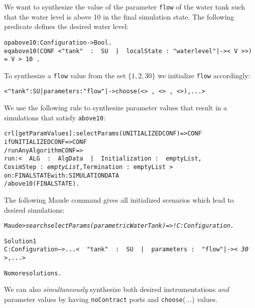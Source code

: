 \begin{example}\label{ex:dse}
We want to synthesize the value of  the parameter \texttt{flow} of
the water tank  such that the water level is above 10 in the final
simulation state. The following  predicate defines the desired water level:

\small
\begin{alltt}
op above10 : Configuration -> Bool .
eq above10(CONF\,< "tank"\,\,:\,\,SU\,\,|\,\,localState\,:\,"waterlevel" |-> <\,V\,> >)\,=\,V\,>\,10\,.  
\end{alltt}
\normalsize

\noindent  To synthesize a  \texttt{flow} value from the set
$\{1, 2,30\}$ we initialize \texttt{flow} accordingly:

\small
\begin{alltt}
< "tank" : SU | parameters : "flow" |-> choose(<\;>\,,\,<\;>\,,\,<\;>), ... >
\end{alltt}
\normalsize

We use the following rule to synthesize parameter values that result
in a simulations that satisfy \texttt{above10}:

\small
\begin{alltt}
crl [getParamValues] : selectParams(UNITIALIZEDCONF) => CONF 
  if UNITIALIZEDCONF => CONF
  / runAnyAlgorithm CONF => 
       run: <\,\,ALG\,\,:\,\,AlgData\,\,|\,\,Initialization\,:\,\,emptyList, 
                            CosimStep\,:\,\emph{emptyList}, Termination\,:\,emptyList\,> 
       on: FINALSTATE with: SIMULATIONDATA
  / above10(FINALSTATE) .
\end{alltt}
\normalsize

\noindent  The following Maude command gives all initialized scenarios
which lead to desired simulations:  

\small
\begin{alltt}
Maude> \emph{search selectParams(parametricWaterTank) =>! C:Configuration .}

Solution 1
C:Configuration --> ... <\,\,"tank"\,\,:\,\,SU\,\,|\,\,parameters\,:\,\,"flow" |-> \emph{<\,30\,>}, ... >

No more solutions.
\end{alltt}
\normalsize
\end{example}

We
can also \emph{simultaneously} synthesize both desired
instrumentations \emph{and} 
parameter values by having \texttt{noContract} ports and
\texttt{choose}(\emph{...}) values.

